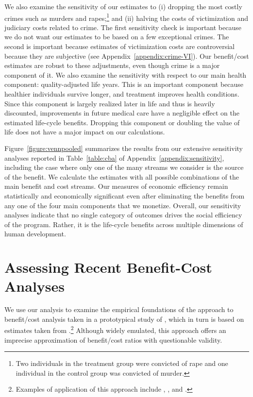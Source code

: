 We also examine the sensitivity of our estimates to (i) dropping the most costly crimes such as murders and rapes;\footnote{Two individuals in the treatment group were convicted of rape and one individual in the control group was convicted of murder.} and (ii) halving the costs of victimization and judiciary costs related to crime. The first sensitivity check is important because we do not want our estimates to be based on a few exceptional crimes. The second is important because estimates of victimization costs are controversial because they are subjective (see  Appendix~\ref{appendix:crime-VI}). Our benefit/cost estimates are robust to these adjustments, even though crime is a major component of it. We also examine the sensitivity with respect to our main health component: quality-adjusted life years. This is an important component because healthier individuals survive longer, and treatment improves health conditions. Since this component is largely realized later in life and thus is heavily discounted, improvements in future medical care have a negligible effect on the estimated life-cycle benefits. Dropping this component or doubling the value of life does not have a major impact on our calculations.

Figure~\ref{figure:vennpooled} summarizes the results from our extensive sensitivity analyses reported in Table~\ref{table:cba} of Appendix~\ref{appendix:sensitivity}, including the case where only one of the many streams we consider is the source of the benefit. We calculate the estimates with all possible combinations of the main benefit and cost streams. Our measures of economic efficiency remain statistically and economically significant even after eliminating the benefits from any one of the four main components that we monetize.  Overall, our sensitivity analyses indicate that no single category of outcomes drives the social efficiency of the program. Rather, it is the life-cycle benefits across multiple dimensions of human development.

\section{Assessing Recent Benefit-Cost Analyses} \label{section:bcaestimates}

\noindent We use our analysis to examine the empirical foundations of the approach to benefit/cost analysis taken in a prototypical study of \citet{Kline_Walters_2016_QJE}, which in turn is based on estimates taken from \citet{Chetty_Friedman_etal_2011_QJoE}.\footnote{Examples of application of this approach include \citet{Attanasio_Kugler_Meghir_2011_AEJAE}, \cite{Behrman-et-al_2011_JHR-Progresa}, and \cite{Lafortune_etal_2018_Reform_AEJAE}.} Although widely emulated, this approach offers an imprecise approximation of benefit/cost ratios with questionable validity.

